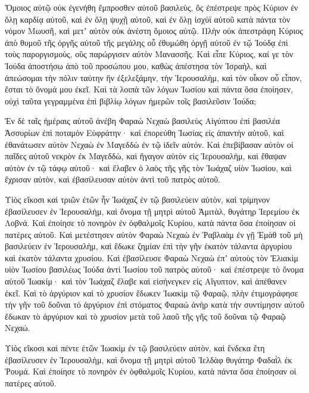 {Ὅμοιος αὐτῷ οὐκ ἐγενήθη ἔμπροσθεν αὐτοῦ βασιλεὺς, ὃς ἐπέστρεψε πρὸς Κύριον ἐν ὅλῃ καρδίᾳ αὐτοῦ, καὶ ἐν ὅλῃ ψυχῇ αὐτοῦ, καὶ ἐν ὅλῃ ἰσχύϊ αὐτοῦ κατὰ πάντα τὸν νόμον Μωυσῆ, καὶ μετʼ αὐτὸν οὐκ ἀνέστη ὅμοιος αὐτῷ.
Πλὴν οὐκ ἀπεστράφη Κύριος ἀπὸ θυμοῦ τῆς ὀργῆς αὐτοῦ τῆς μεγάλης οὗ ἐθυμώθη ὀργῇ αὐτοῦ ἐν τῷ Ἰούδᾳ ἐπὶ τοὺς παροργισμοὺς, οὓς παρώργισεν αὐτὸν Μανασσῆς.
Καὶ εἶπε Κύριος, καί γε τὸν Ἰούδα ἀποστήσω ἀπὸ τοῦ προσώπου μου, καθὼς ἀπέστησα τὸν Ἰσραὴλ, καὶ ἀπεώσομαι τὴν πόλιν ταύτην ἣν ἐξελεξάμην, τὴν Ἱερουσαλὴμ, καὶ τὸν οἶκον οὗ εἶπον, ἔσται τὸ ὄνομά μου ἐκεῖ.
Καὶ τὰ λοιπὰ τῶν λόγων Ἰωσίου καὶ πάντα ὅσα ἐποίησεν, οὐχὶ ταῦτα γεγραμμένα ἐπὶ βιβλίῳ λόγων ἡμερῶν τοῖς βασιλεῦσιν Ἰούδα;
\par }{\PP {}Ἐν δὲ ταῖς ἡμέραις αὐτοῦ ἀνέβη Φαραὼ Νεχαὼ βασιλεὺς Αἰγύπτου ἐπὶ βασιλέα Ἀσσυρίων ἐπὶ ποταμὸν Εὐφράτην· καὶ ἐπορεύθη Ἰωσίας εἰς ἀπαντὴν αὐτοῦ, καὶ ἐθανάτωσεν αὐτὸν Νεχαὼ ἐν Μαγεδδὼ ἐν τῷ ἰδεῖν αὐτόν.
Καὶ ἐπεβίβασαν αὐτὸν οἱ παῖδες αὐτοῦ νεκρὸν ἐκ Μαγεδδὼ, καὶ ἤγαγον αὐτὸν εἰς Ἱερουσαλὴμ, καὶ ἔθαψαν αὐτὸν ἐν τῷ τάφῳ αὐτοῦ· καὶ ἔλαβεν ὁ λαὸς τῆς γῆς τὸν Ἰωάχαζ υἱὸν Ἰωσίου, καὶ ἔχρισαν αὐτὸν, καὶ ἐβασίλευσαν αὐτὸν ἀντὶ τοῦ πατρὸς αὐτοῦ.
\par }{\PP {}Υἱὸς εἴκοσι καὶ τριῶν ἐτῶν ἦν Ἰωάχαζ ἐν τῷ βασιλεύειν αὐτὸν, καὶ τρίμηνον ἐβασίλευσεν ἐν Ἱερουσαλὴμ, καὶ ὄνομα τῇ μητρὶ αὐτοῦ Ἀμιτὰλ, θυγάτηρ Ἱερεμίου ἐκ Λοβνά.
Καὶ ἐποίησε τὸ πονηρὸν ἐν ὀφθαλμοῖς Κυρίου, κατὰ πάντα ὅσα ἐποίησαν οἱ πατέρες αὐτοῦ.
Καὶ μετέστησεν αὐτὸν Φαραὼ Νεχαὼ ἐν Ῥαβλαὰμ ἐν γῇ Ἐμὰθ τοῦ μὴ βασιλεύειν ἐν Ἱερουσαλὴμ, καὶ ἔδωκε ζημίαν ἐπὶ τὴν γῆν ἑκατὸν τάλαντα ἀργυρίου καὶ ἑκατὸν τάλαντα χρυσίου.
Καὶ ἐβασίλευσε Φαραὼ Νεχαὼ ἐπʼ αὐτοὺς τὸν Ἐλιακὶμ υἱὸν Ἰωσίου βασιλέως Ἰούδα ἀντὶ Ἰωσίου τοῦ πατρὸς αὐτοῦ· καὶ ἐπέστρεψε τὸ ὄνομα αὐτοῦ Ἰωακίμ· καὶ τὸν Ἰωάχαζ ἔλαβε καὶ εἰσήνεγκεν εἰς Αἴγυπτον, καὶ ἀπέθανεν ἐκεῖ.
Καὶ τὸ ἀργύριον καὶ τὸ χρυσίον ἔδωκεν Ἰωακὶμ τῷ Φαραῷ, πλὴν ἐτιμογράφησε τὴν γῆν τοῦ δοῦναι τὸ ἀργύριον ἐπὶ στόματος Φαραώ ἀνὴρ κατὰ τὴν συντίμησιν αὐτοῦ ἔδωκαν τὸ ἀργύριον καὶ τὸ χρυσίον μετὰ τοῦ λαοῦ τῆς γῆς τοῦ δοῦναι τῷ Φαραῷ Νεχαώ.
\par }{\PP {}Υἱὸς εἴκοσι καὶ πέντε ἐτῶν Ἰωακὶμ ἐν τῷ βασιλεύειν αὐτὸν, καὶ ἕνδεκα ἔτη ἐβασίλευσεν ἐν Ἱερουσαλὴμ, καὶ ὄνομα τῇ μητρὶ αὐτοῦ Ἰελδὰφ θυγάτηρ Φαδαῒλ ἐκ Ῥουμά.
Καὶ ἐποίησε τὸ πονηρὸν ἐν ὀφθαλμοῖς Κυρίου, κατὰ πάντα ὅσα ἐποίησαν οἱ πατέρες αὐτοῦ.

}
